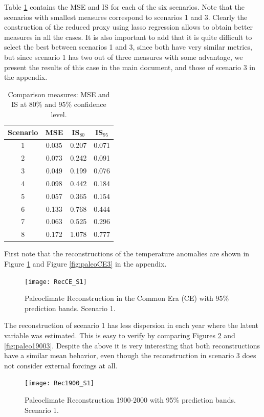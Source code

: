 \documentclass[11pt]{amsart}
\theoremstyle{plain}
\theoremstyle{definition}
\theoremstyle{remark}
\begin{document}
Table \ref{tab:comparison} contains the MSE and IS for each of the six
scenarios. Note that the scenarios with smallest measures correspond to
scenarios 1 and 3. Clearly the construction of the reduced proxy using lasso
regression allows to obtain better measures in all the cases. It is also
important to add that it is quite difficult to select the best between scenarios
1 and 3, since both have very similar metrics, but since scenario 1 has two out
of three measures with some advantage, we present the results of this case in
the main document, and those of scenario 3 in the appendix.
\begin{table}
  \centering
  \begin{tabular}{c|ccc}
    \toprule
    \textbf{Scenario} & MSE & IS$_{80}$ & IS$_{95}$ \\
    \midrule
    1 & 0.035 & 0.207 & 0.071 \\
    2 & 0.073 & 0.242 & 0.091 \\
    3 & 0.049 & 0.199 & 0.076\\
    4 & 0.098 & 0.442 & 0.184\\
    5 & 0.057 & 0.365 & 0.154\\
    6 & 0.133 & 0.768 & 0.444\\
    7 & 0.063 & 0.525 & 0.296 \\
    8 & 0.172 & 1.078 & 0.777\\
    \bottomrule
  \end{tabular}
  \caption{Comparison measures: MSE and IS at 80\% and 95\% confidence level.}
  \label{tab:comparison}
\end{table}

First note that the reconstructions of the temperature anomalies are shown in
Figure \ref{fig:paleoCE1} and Figure \ref{fig:paleoCE3} in the appendix.
\begin{figure}
  \centering
  \texttt{[image: RecCE\_S1]}
  \caption{Paleoclimate Reconstruction in the Common Era (CE) with 95\%
    prediction bands. Scenario 1.}
  \label{fig:paleoCE1}
\end{figure}
The reconstruction of scenario 1 has less dispersion in each year where the
latent variable was estimated. This is easy to verify by comparing Figures
\ref{fig:paleo19001} and \ref{fig:paleo19003}. Despite the above it is very
interesting that both reconstructions have a similar mean behavior, even though
the reconstruction in scenario 3 does not consider external forcings at all.  

\begin{figure}
  \centering
  \texttt{[image: Rec1900\_S1]}
  \caption{Paleoclimate Reconstruction 1900-2000 with 95\%
    prediction bands. Scenario 1.}
  \label{fig:paleo19001}
\end{figure}
\end{document}
